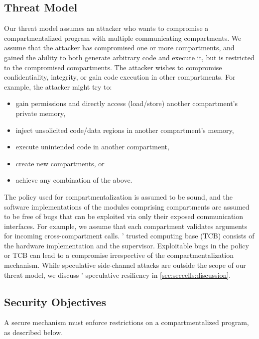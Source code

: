 \subsection{Threat Model}
\label{sec:seccells:reqs:threat}

Our threat model assumes an attacker who wants to compromise a 
compartmentalized program with multiple communicating compartments.
We assume that the attacker has compromised one or more compartments, and
gained the ability to both generate arbitrary code and execute it,
but is restricted to the compromised compartments.
The attacker wishes to compromise confidentiality, integrity, or 
gain code execution in other compartments.
%
For example, the attacker might try to:
\begin{itemize}
  \item gain permissions and directly access (load/store) 
        another compartment's private memory,
  \item inject unsolicited code/data regions in another 
        compartment's memory,
  \item execute unintended code in another compartment,
  \item create new compartments, or
  \item achieve any combination of the above.
\end{itemize}

The policy used for compartmentalization is assumed to be sound, and the software
implementations of the modules comprising compartments are assumed to be
free of bugs that can be exploited via only their exposed communication
interfaces.
For example, we assume that each compartment validates arguments for
incoming cross-compartment calls.
\seccells' trusted computing base (TCB) consists of the hardware implementation
and the supervisor.
Exploitable bugs in the policy or TCB can lead to a compromise irrespective of the
compartmentalization mechanism.
While speculative side-channel attacks are outside the scope of our threat model,
we discuss \seccells' speculative resiliency in \autoref{sec:seccells:discussion}.

\subsection{Security Objectives}
\label{sec:seccells:reqs:security}
A secure mechanism must enforce restrictions on a compartmentalized program,
as described below.

